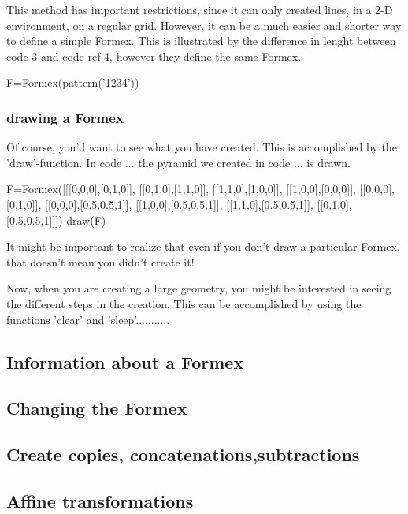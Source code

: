 \documentclass[a4paper]{manual}
\newenvironment{mycode}{\par\small\sffamily}{} %
\begin{document}
{This method has important restrictions, since it can only created lines, in a 2-D environment, on a regular grid. However, it can be a much easier and shorter way to define a simple Formex. This is illustrated by the difference in lenght between code 3 and code ref 4, however they define the same Formex.
\begin{mycode}
	F=Formex(pattern('1234'))
\end{mycode}

\subsubsection{drawing a Formex}

Of course, you'd want to see what you have created. This is accomplished by the 'draw'-function. In code ... the pyramid we created in code ... is drawn.
\begin{mycode}
	F=Formex([[[0,0,0],[0,1,0]], [[0,1,0],[1,1,0]], [[1,1,0],[1,0,0]], [[1,0,0],[0,0,0]], [[0,0,0],[0,1,0]], [[0,0,0],[0.5,0.5,1]], [[1,0,0],[0.5,0.5,1]], [[1,1,0],[0.5,0.5,1]], [[0,1,0],[0.5,0.5,1]]])
draw(F)
\end{mycode}
 
It might be important to realize that even if you don't draw a particular Formex, that doesn't mean you didn't create it!

Now, when you are creating a large geometry, you might be interested in seeing the different steps in the creation. This can be accomplished by using the functions 'clear' and 'sleep'...........

\subsection{Information about a Formex}

\subsection{Changing the Formex}\label{changing F}

\subsection{Create copies, concatenations,subtractions}\label{copy F}

\subsection{Affine transformations}

}
\end{document}
